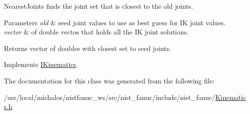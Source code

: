 Nearest\-Joints finds the joint set that is closest to the old joints. 


\begin{DoxyParams}{Parameters}
{\em old} & seed joint values to use as best guess for I\-K joint values. \\
\hline
{\em vector} & of double vectos that holds all the I\-K joint solutions. \\
\hline
\end{DoxyParams}
\begin{DoxyReturn}{Returns}
vector of doubles with closest set to seed joints. 
\end{DoxyReturn}


Implements \hyperlink{classIKinematics_ab74b70ed6ecc53adfc36505b8dd1fef4}{I\-Kinematics}.



The documentation for this class was generated from the following file\-:\begin{DoxyCompactItemize}
\item 
/usr/local/michalos/nistfanuc\-\_\-ws/src/nist\-\_\-fanuc/include/nist\-\_\-fanuc/\hyperlink{Kinematics_8h}{Kinematics.\-h}\end{DoxyCompactItemize}
